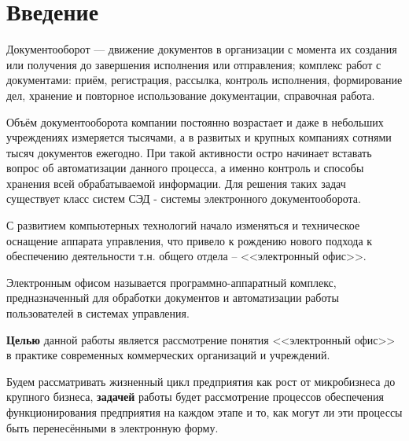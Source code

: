 \section*{Введение}
%

Документооборот — движение документов в организации с момента их создания или получения до завершения исполнения или отправления\cite{GOST7082013}; комплекс работ с документами: приём, регистрация, рассылка, контроль исполнения, формирование дел, хранение и повторное использование документации, справочная работа.

Объём документооборота компании постоянно возрастает и даже в небольших учреждениях измеряется тысячами, а в развитых и крупных компаниях сотнями тысяч документов ежегодно. При такой активности остро начинает вставать вопрос об автоматизации данного процесса, а именно контроль и способы хранения всей обрабатываемой информации. Для решения таких задач существует класс систем СЭД - системы электронного документооборота.

С развитием компьютерных технологий начало изменяться и техническое оснащение аппарата управления, что привело к рождению нового подхода к обеспечению деятельности т.н. общего отдела – <<электронный офис>>.

Электронным офисом называется программно-аппаратный комплекс, предназначенный для обработки документов и автоматизации работы пользователей в системах управления.

\textbf{Целью} данной работы является рассмотрение понятия <<электронный офис>> в практике современных коммерческих организаций и учреждений.

Будем рассматривать жизненный цикл предприятия как рост от микробизнеса до крупного бизнеса, \textbf{задачей} работы будет рассмотрение процессов обеспечения функционирования предприятия на каждом этапе и то, как могут ли эти процессы быть перенесёнными в электронную форму.

